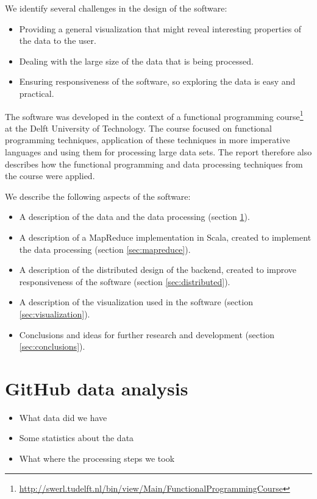 \documentclass[10pt,a4paper]{article}
\begin{document}
We identify several challenges in the design of the software:
\begin{itemize}
    \item Providing a general visualization that might reveal interesting properties of the data to the user.
    \item Dealing with the large size of the data that is being processed.
    \item Ensuring responsiveness of the software, so exploring the data is easy and practical.
\end{itemize}

The software was developed in the context of a functional programming course\footnote{\url{http://swerl.tudelft.nl/bin/view/Main/FunctionalProgrammingCourse}} at the Delft University of Technology. The course focused on functional programming techniques, application of these techniques in more imperative languages and using them for processing large data sets. The report therefore also describes how the functional programming and data processing techniques from the course were applied.

We describe the following aspects of the software:
\begin{itemize}
    \item A description of the data and the data processing (section \ref{sec:data}).
    \item A description of a MapReduce implementation in Scala, created to implement the data processing (section \ref{sec:mapreduce}).
    \item A description of the distributed design of the backend, created to improve responsiveness of the software (section \ref{sec:distributed}).
    \item A description of the visualization used in the software (section \ref{sec:visualization}).
    \item Conclusions and ideas for further research and development (section \ref{sec:conclusions}).
\end{itemize}

\section{GitHub data analysis}\label{sec:data}

\begin{itemize}
    \item What data did we have
    \item Some statistics about the data
    \item What where the processing steps we took
\end{itemize}
\end{document}
